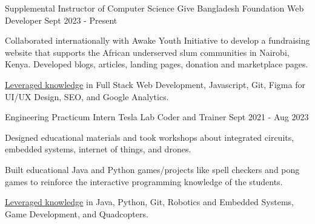 

\begin{cventries}

\cventryalt
    {Supplemental Instructor of Computer Science} %
    {Give Bangladesh Foundation} %
    {Web Developer} %
    {Sept 2023 - Present} %
    {
      \begin{cvitems}
      \item {Collaborated internationally with Awake Youth Initiative to develop a fundraising website that supports the African underserved slum communities in Nairobi, Kenya. 
      Developed blogs, articles, landing pages, donation and marketplace pages.}
      \item {\underline{Leveraged knowledge} in Full Stack Web Development, Javascript, Git, Figma for UI/UX Design, SEO, and Google Analytics.}
      \end{cvitems}
    }

\cventryalt
    {Engineering Practicum Intern} %
    {Tesla Lab} %
    {Coder and Trainer} %
    {Sept 2021 - Aug 2023} %
    {
      \begin{cvitems}
        \item {Designed educational materials and took workshops about integrated circuits, embedded systems, internet of things, and drones.}
        \item {Built educational Java and Python games/projects like spell checkers and pong games to reinforce the interactive programming knowledge of the students.}
        \item {\underline{Leveraged knowledge} in Java, Python, Git, Robotics and Embedded Systems, Game Development, and Quadcopters.}
      \end{cvitems}
    }

\end{cventries}
